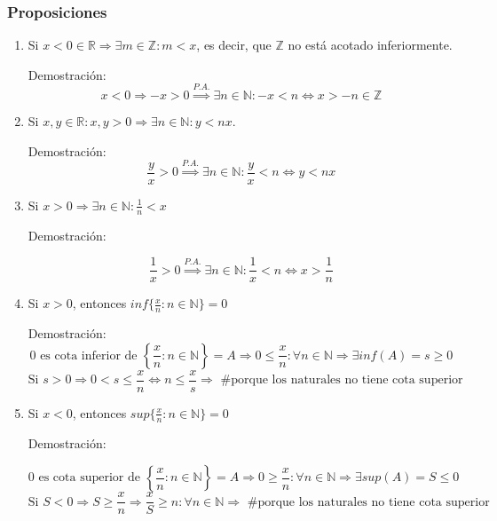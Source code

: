 \documentclass[10pt,a4paper,openright]{book}
\begin{document}
\subsubsection*{Proposiciones}
\begin{enumerate}
\item Si $x<0\in \mathbb R\Rightarrow \exists m\in \mathbb Z: m<x$, es decir, que $\mathbb Z$ no está acotado inferiormente.\par
Demostración:
$$x<0\Rightarrow -x>0\stackrel{P.A.}{\Rightarrow} \exists n \in \mathbb N: -x<n\Leftrightarrow x>-n\in \mathbb Z$$
\vspace{0.15cm}

\item Si $x,y\in \mathbb R: x,y>0\Rightarrow \exists n \in \mathbb N : y<nx$.\par
Demostración:
$$\frac{y}{x}>0\stackrel{P.A.}{\Rightarrow} \exists n \in \mathbb N : \frac{y}{x}<n \Leftrightarrow y<nx$$
\vspace{0.15cm}

\item Si $x>0\Rightarrow \exists n \in \mathbb N : \frac{1}{n}<x$\par
Demostración:\par
$$\frac{1}{x}>0\stackrel{P.A.}{\Rightarrow }\exists n \in \mathbb N : \frac{1}{x}<n\Leftrightarrow x>\frac{1}{n}$$			
\vspace{0.15cm}

\item Si $x>0$, entonces $inf\{\frac{x}{n}: n\in \mathbb N\}=0$\par
Demostración:
$$\mbox{0 es cota inferior de } \left\lbrace\frac{x}{n}: n\in \mathbb N\right\rbrace=A\Rightarrow 0\leq \frac{x}{n}: \forall n\in \mathbb N \Rightarrow \exists inf(A)=s\geq 0$$
$$\mbox{Si }s>0\Rightarrow 0<s\leq \frac{x}{n}\Leftrightarrow n\leq \frac{x}{s}\Rightarrow \mbox{ \# porque los naturales no tiene cota superior}$$
\vspace{0.15cm}

\item Si $x<0$, entonces $sup\{\frac{x}{n}: n\in \mathbb N\}=0$\par
Demostración:\par
$$\mbox{0 es cota superior de } \left\lbrace\frac{x}{n}: n\in \mathbb N\right\rbrace=A\Rightarrow 0\geq \frac{x}{n}: \forall n\in \mathbb N\Rightarrow \exists sup(A)=S \leq 0$$
$$\mbox{Si }S<0\Rightarrow S\geq \frac{x}{n}\Rightarrow \frac{x}{S}\geq n: \forall n \in \mathbb N\Rightarrow \mbox{ \# porque los naturales no tiene cota superior}$$
\vspace{0.15cm}


\end{enumerate}
\end{document}
